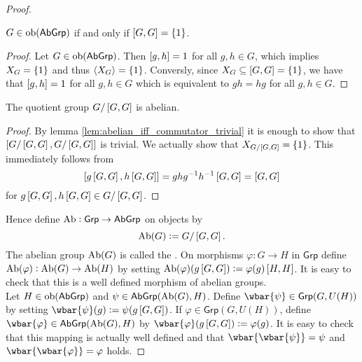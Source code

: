 \begin{proof}
	\begin{lemma}
		$G \in \operatorname{ob}(\mathsf{AbGrp})$ if and only if $\sbr{G,G} = \cbr{1}$.
		\label{lem:abelian_iff_commutator_trivial}
	\end{lemma}

	\begin{proof}
		Let $G \in \operatorname{ob}(\mathsf{AbGrp})$. Then $\sbr[0]{g,h} = 1$ for all $g,h \in G$, which implies $X_G = \cbr{1}$ and thus $\langle X_G \rangle = \cbr{1}$. Conversly, since $X_G \subseteq \sbr{G,G} = \cbr{1}$, we have that $\sbr[0]{g,h} = 1$ for all $g,h \in G$ which is equivalent to $gh = hg$ for all $g,h \in G$.	
	\end{proof}

	\begin{corollary}
		The quotient group $G/\sbr{G,G}$ is abelian.
	\end{corollary}

	\begin{proof}
		By lemma \ref{lem:abelian_iff_commutator_trivial} it is enough to show that $\sbr[0]{G/\sbr{G,G},G/\sbr{G,G}}$ is trivial. We actually show that $X_{G/\sbr[0]{G,G}} = \cbr{1}$. This immediately follows from
		\begin{equation*}
			\sbr[0]{g\sbr{G,G},h\sbr{G,G}} = ghg^{-1}h^{-1}\sbr{G,G} = \sbr{G,G}
		\end{equation*}
		\noindent for $g\sbr{G,G},h\sbr{G,G} \in G/\sbr{G,G}$.
	\end{proof}

	Hence define $\operatorname{Ab} : \mathsf{Grp} \to \mathsf{AbGrp}$ on objects by
	\begin{equation*}
		\Ab(G) := G/\sbr{G,G}.
	\end{equation*}
	The abelian group $\operatorname{Ab}(G)$ is called the . On morphisms $\varphi : G \to H$ in $\mathsf{Grp}$ define $\operatorname{Ab}(\varphi) : \operatorname{Ab}(G) \to \operatorname{Ab}(H)$ by setting $\Ab(\varphi)(g\sbr{G,G}) := \varphi(g)\sbr{H,H}$. It is easy to check that this is a well defined morphism of abelian groups.\\
	Let $H \in \operatorname{ob}(\mathsf{AbGrp})$ and $\psi \in \mathsf{AbGrp}(\operatorname{Ab}(G),H)$. Define $\wbar{\psi} \in \mathsf{Grp}(G,U(H))$ by setting $\wbar{\psi}(g) := \psi(g\sbr{G,G})$. If $\varphi \in \mathsf{Grp}(G,U(H))$, define $\wbar{\varphi} \in \mathsf{AbGrp}(\Ab(G),H)$ by $\wbar{\varphi}(g\sbr{G,G}) := \varphi(g)$. It is easy to check that this mapping is actually well defined and that $\wbar{\wbar{\psi}} = \psi$ and $\wbar{\wbar{\varphi}} = \varphi$ holds.
\end{proof}


